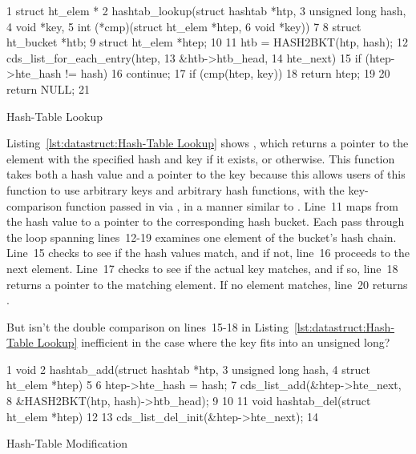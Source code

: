 \begin{listing}[tb]
{ \scriptsize
\begin{verbbox}
 1 struct ht_elem *
 2 hashtab_lookup(struct hashtab *htp,
 3                unsigned long hash,
 4                void *key,
 5                int (*cmp)(struct ht_elem *htep,
 6                           void *key))
 7 {
 8   struct ht_bucket *htb;
 9   struct ht_elem *htep;
10 
11   htb = HASH2BKT(htp, hash);
12   cds_list_for_each_entry(htep,
13                           &htb->htb_head,
14                           hte_next) {
15     if (htep->hte_hash != hash)
16       continue;
17     if (cmp(htep, key))
18       return htep;
19   }
20   return NULL;
21 }
\end{verbbox}
}
\centering
\theverbbox
\caption{Hash-Table Lookup}
\label{lst:datastruct:Hash-Table Lookup}
\end{listing}

Listing~\ref{lst:datastruct:Hash-Table Lookup}
shows ,
which returns a pointer to the element with the specified hash and key if it
exists, or  otherwise.
This function takes both a hash value and a pointer to the key because
this allows users of this function to use arbitrary keys and
arbitrary hash functions, with the key-comparison function passed in via
, in a manner similar to .
Line~11 maps from the hash value to a pointer to the corresponding
hash bucket.
Each pass through the loop spanning lines~12-19 examines one element
of the bucket's hash chain.
Line~15 checks to see if the hash values match, and if not, line~16
proceeds to the next element.
Line~17 checks to see if the actual key matches, and if so,
line~18 returns a pointer to the matching element.
If no element matches, line~20 returns .

\QuickQuiz{}
	But isn't the double comparison on lines~15-18 in
	Listing~\ref{lst:datastruct:Hash-Table Lookup} inefficient
	in the case where the key fits into an unsigned long?
 \QuickQuizEnd

\begin{listing}[tb]
{ \scriptsize
\begin{verbbox}
 1 void
 2 hashtab_add(struct hashtab *htp,
 3             unsigned long hash,
 4             struct ht_elem *htep)
 5 {
 6   htep->hte_hash = hash;
 7   cds_list_add(&htep->hte_next,
 8                &HASH2BKT(htp, hash)->htb_head);
 9 }
10 
11 void hashtab_del(struct ht_elem *htep)
12 {
13   cds_list_del_init(&htep->hte_next);
14 }
\end{verbbox}
}
\centering
\theverbbox
\caption{Hash-Table Modification}
\label{lst:datastruct:Hash-Table Modification}
\end{listing}

